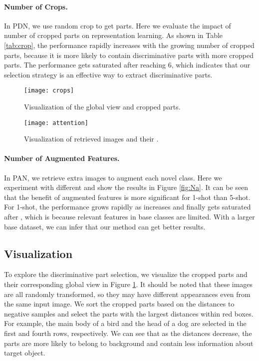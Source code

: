 \documentclass{article}
\begin{document}
\paragraph{Number of Crops.} In PDN, we use random crop to get  parts. Here we evaluate the impact of number of cropped parts on representation learning. As shown in Table \ref{tab:crop}, the performance rapidly increases with the growing number of cropped parts, because it is more likely to contain discriminative parts with more cropped parts. The performance gets saturated after reaching 6, which indicates that our selection strategy is an effective way to extract discriminative parts.


\begin{figure}[t]
    \centering
    \texttt{[image: crops]}
    \caption{Visualization of the global view and cropped parts. }
    \label{fig:crops}
\end{figure}

\begin{figure}[t]
    \centering
    \texttt{[image: attention]}
    \caption{Visualization of retrieved images and their .}
    \label{fig:attention}
\end{figure}

\paragraph{Number of Augmented Features.} In PAN, we retrieve  extra images to augment each novel class. Here we experiment with different  and show the results in Figure \ref{fig:Na}. It can be seen that the benefit of augmented features is more significant for 1-shot than 5-shot.
For 1-shot, the performance grows rapidly as  increases and finally gets saturated after , which is because relevant features in base classes are limited. With a larger base dataset, we can infer that our method can get better results.

\subsection{Visualization}
To explore the discriminative part selection, we visualize the cropped parts and their corresponding global view in Figure \ref{fig:crops}. It should be noted that these images are all randomly transformed, so they may have different appearances even from the same input image.
We sort the cropped parts based on the distances to negative samples and select the parts with the largest distances within red boxes. For example, the main body of a bird and the head of a dog are selected in the first and fourth rows, respectively.
We can see that as the distances decrease, the parts are more likely to belong to background and contain less information about target object. 
\end{document}

